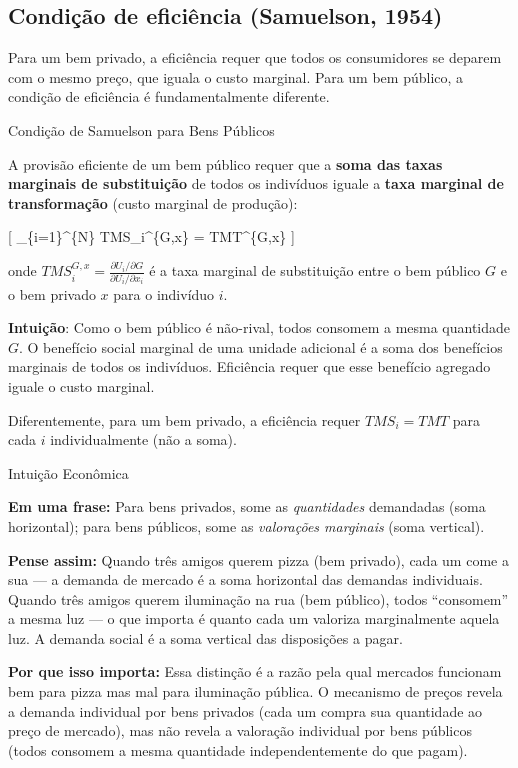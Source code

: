 \documentclass[11pt,twoside,openright]{book}
\begin{document}
\subsection{Condição de eficiência (Samuelson,
1954)}\label{condiuxe7uxe3o-de-eficiuxeancia-samuelson-1954}

Para um bem privado, a eficiência requer que todos os consumidores se
deparem com o mesmo preço, que iguala o custo marginal. Para um bem
público, a condição de eficiência é fundamentalmente diferente.

\begin{theorembox}{Condição de Samuelson para Bens Públicos}

A provisão eficiente de um bem público requer que a \textbf{soma das
taxas marginais de substituição} de todos os indivíduos iguale a
\textbf{taxa marginal de transformação} (custo marginal de produção):

{[} \sum\_\{i=1\}\^{}\{N\} TMS\_i\^{}\{G,x\} = TMT\^{}\{G,x\}
\label{eq:20.11}  {]}

onde
\(TMS_i^{G,x} = \frac{\partial U_i / \partial G}{\partial U_i / \partial x_i}\)
é a taxa marginal de substituição entre o bem público \(G\) e o bem
privado \(x\) para o indivíduo \(i\).

\end{theorembox}

\textbf{Intuição}: Como o bem público é não-rival, todos consomem a
mesma quantidade \(G\). O benefício social marginal de uma unidade
adicional é a soma dos benefícios marginais de todos os indivíduos.
Eficiência requer que esse benefício agregado iguale o custo marginal.

Diferentemente, para um bem privado, a eficiência requer \(TMS_i = TMT\)
para cada \(i\) individualmente (não a soma).

\begin{intuitionbox}{Intuição Econômica}

\textbf{Em uma frase:} Para bens privados, some as \emph{quantidades}
demandadas (soma horizontal); para bens públicos, some as
\emph{valorações marginais} (soma vertical).

\textbf{Pense assim:} Quando três amigos querem pizza (bem privado),
cada um come a sua --- a demanda de mercado é a soma horizontal das
demandas individuais. Quando três amigos querem iluminação na rua (bem
público), todos ``consomem'' a mesma luz --- o que importa é quanto cada
um valoriza marginalmente aquela luz. A demanda social é a soma vertical
das disposições a pagar.

\textbf{Por que isso importa:} Essa distinção é a razão pela qual
mercados funcionam bem para pizza mas mal para iluminação pública. O
mecanismo de preços revela a demanda individual por bens privados (cada
um compra sua quantidade ao preço de mercado), mas não revela a
valoração individual por bens públicos (todos consomem a mesma
quantidade independentemente do que pagam).

\end{intuitionbox}
\end{document}
